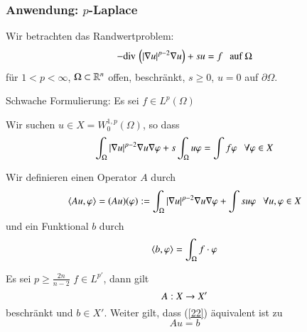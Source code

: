\subsubsection*{Anwendung: $p$-Laplace}

Wir betrachten das Randwertproblem:
\[
    -\mathrm{div}\,\left( |\nabla u|^{p-2} \nabla u \right) + su =f \hspace{.25cm} \text{auf } \Omega
\]
für $1<p<\infty$, $\Omega\subset\mathbb{R}^n$ offen, beschränkt, $s\geq 0$, $u=0$ auf $\partial\Omega$.

\noindent Schwache Formulierung: Es sei $f\in L^p (\Omega)$

Wir suchen $u\in X= W^{1,p}_0(\Omega)$, so dass
\begin{align}\label{22}
    \int_\Omega |\nabla u|^{p-2} \nabla u \nabla \varphi + s\int_{\Omega}u\varphi=\int f\varphi \hspace{.25cm} \forall \varphi \in X
\end{align}

Wir definieren einen Operator $A$ durch
\[
    \langle Au,\varphi\rangle = (Au)(\varphi) := \int_\Omega |\nabla u|^{p-2}\nabla u \nabla \varphi +\int su\varphi \hspace{.25cm} 
    \forall u,\varphi \in X
\]
und ein Funktional $b$ durch
\[
\langle b,\varphi \rangle = \int_\Omega f\cdot \varphi
\]

\begin{lem}\label{4.10}
    Es sei $p\geq \frac{2n}{n-2}$ $f\in L^{p'}$, dann gilt
    \[
        A:X\rightarrow X'
    \]
    beschränkt und $b\in X'$. Weiter gilt, dass (\ref{22}) äquivalent ist zu
    \[
        Au=b
    \]
\end{lem}

